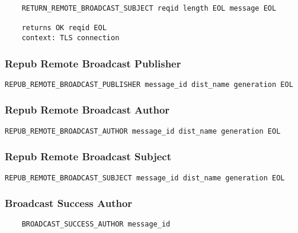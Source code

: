 \documentclass[letterpaper,11pt,oneside]{article}
\begin{document}
\vspace{10pt}
\begin{verbatim}
    RETURN_REMOTE_BROADCAST_SUBJECT reqid length EOL message EOL

    returns OK reqid EOL
    context: TLS connection
\end{verbatim}
\vspace{10pt}

\subsubsection{Repub Remote Broadcast Publisher}

\vspace{10pt}
\begin{verbatim}
REPUB_REMOTE_BROADCAST_PUBLISHER message_id dist_name generation EOL
\end{verbatim}
\vspace{10pt}

\subsubsection{Repub Remote Broadcast Author}

\vspace{10pt}
\begin{verbatim}
REPUB_REMOTE_BROADCAST_AUTHOR message_id dist_name generation EOL
\end{verbatim}
\vspace{10pt}

\subsubsection{Repub Remote Broadcast Subject}

\vspace{10pt}
\begin{verbatim}
REPUB_REMOTE_BROADCAST_SUBJECT message_id dist_name generation EOL
\end{verbatim}
\vspace{10pt}

\subsubsection{Broadcast Success Author}

\vspace{10pt}
\begin{verbatim}
    BROADCAST_SUCCESS_AUTHOR message_id
\end{verbatim}
\vspace{10pt}
\end{document}
